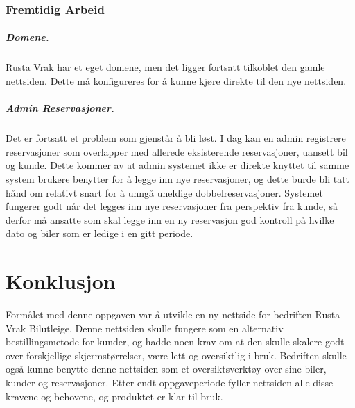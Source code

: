 \subsection*{Fremtidig Arbeid}
\paragraph*{Domene.}
Rusta Vrak har et eget domene, men det ligger fortsatt tilkoblet den gamle nettsiden. Dette må konfigureres for å kunne kjøre direkte til den nye nettsiden.

\paragraph*{Admin Reservasjoner.}
Det er fortsatt et problem som gjenstår å bli løst. I dag kan en admin registrere reservasjoner som overlapper med allerede eksisterende reservasjoner, uansett bil og kunde. Dette kommer av at admin systemet ikke er direkte knyttet til samme system brukere benytter for å legge inn nye reservasjoner, og dette burde bli tatt hånd om relativt snart for å unngå uheldige dobbelreservasjoner. 
Systemet fungerer godt når det legges inn nye reservasjoner fra perspektiv fra kunde, så derfor må ansatte som skal legge inn en ny reservasjon god kontroll på hvilke dato og biler som er ledige i en gitt periode.



\chapter{Konklusjon}
Formålet med denne oppgaven var å utvikle en ny nettside for bedriften Rusta Vrak Bilutleige. Denne nettsiden skulle fungere som en alternativ bestillingsmetode for kunder, og hadde noen krav om at den skulle skalere godt over forskjellige skjermstørrelser, være lett og oversiktlig i bruk. Bedriften skulle også kunne benytte denne nettsiden som et oversiktsverktøy over sine biler, kunder og reservasjoner. Etter endt oppgaveperiode fyller nettsiden alle disse kravene og behovene, og produktet er klar til bruk.


